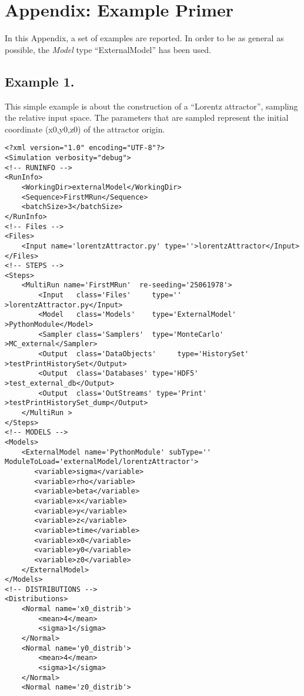 \appendix
\section{Appendix: Example Primer}
\label{sec:examplePrimer}
In this Appendix, a set of examples are reported. In order to be as general as possible, the \textit{Model} type ``ExternalModel'' has been used.
\subsection{Example 1.}
\label{subsec:ex1}
This simple example is about the construction of a ``Lorentz attractor'', sampling the relative input space. The parameters that are sampled represent the initial coordinate (x0,y0,z0) of the attractor origin.

\begin{lstlisting}[style=XML,morekeywords={debug,re,seeding,class,subType,limit}]
<?xml version="1.0" encoding="UTF-8"?>
<Simulation verbosity="debug">
<!-- RUNINFO -->
<RunInfo>
    <WorkingDir>externalModel</WorkingDir>
    <Sequence>FirstMRun</Sequence>
    <batchSize>3</batchSize>
</RunInfo>
<!-- Files -->
<Files>
    <Input name='lorentzAttractor.py' type=''>lorentzAttractor</Input>
</Files>
<!-- STEPS -->
<Steps>
    <MultiRun name='FirstMRun'  re-seeding='25061978'>
        <Input   class='Files'     type=''               >lorentzAttractor.py</Input>
        <Model   class='Models'    type='ExternalModel'  >PythonModule</Model>
        <Sampler class='Samplers'  type='MonteCarlo'     >MC_external</Sampler>
        <Output  class='DataObjects'     type='HistorySet'      >testPrintHistorySet</Output>
        <Output  class='Databases' type='HDF5'           >test_external_db</Output>
        <Output  class='OutStreams' type='Print'   >testPrintHistorySet_dump</Output>
    </MultiRun >
</Steps>
<!-- MODELS -->
<Models>
    <ExternalModel name='PythonModule' subType='' ModuleToLoad='externalModel/lorentzAttractor'>
       <variable>sigma</variable>
       <variable>rho</variable>
       <variable>beta</variable>
       <variable>x</variable>
       <variable>y</variable>
       <variable>z</variable>
       <variable>time</variable>
       <variable>x0</variable>
       <variable>y0</variable>
       <variable>z0</variable>
    </ExternalModel>
</Models>
<!-- DISTRIBUTIONS -->
<Distributions>
    <Normal name='x0_distrib'>
        <mean>4</mean>
        <sigma>1</sigma>
    </Normal>
    <Normal name='y0_distrib'>
        <mean>4</mean>
        <sigma>1</sigma>
    </Normal>
    <Normal name='z0_distrib'>

\end{lstlisting}

